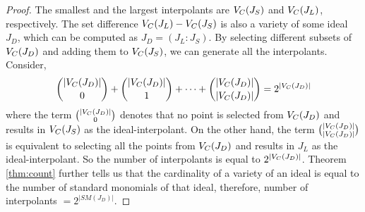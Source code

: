 \par {} 
\begin{proof}
The smallest and the largest interpolants are ${V_C}(J_S)$ and ${V_C}(J_L)$,
respectively. The set difference ${V_C}(J_L) - {V_C}(J_S)$ is also a
variety of some ideal $J_D$, which can be computed as
$J_D=(J_L:J_S)$. By selecting different subsets of ${V_C}(J_D)$ and
adding them to ${V_C}(J_S)$, we can generate all the 
interpolants. Consider, 
\begin{align*}
\label{eqn:pwsetjd}
\binom{|{V_C}(J_D)|}{0} + \binom{|{V_C}(J_D)|}{1} + \cdots + \binom{|{V_C}(J_D)|}{|{V_C}(J_D)|} = 2^{|{V_C}(J_D)|}
\end{align*}
where the term $\binom{|{V_C}(J_D)|}{0}$ denotes that no point is selected from ${V_C}(J_D)$ and results in 
${V_C}(J_S)$ as the ideal-interpolant. On the other hand, the term $\binom{|{V_C}(J_D)|}{|{V_C}(J_D)|}$ is equivalent 
to selecting  all the points from ${V_C}(J_D)$ and results in $J_L$ as 
the ideal-interpolant. So the number of interpolants is equal to
$2^{|{V_C}(J_D)|}$. Theorem \ref{thm:count} further tells us that the 
cardinality of a variety of an ideal is equal to the number of
standard monomials of that ideal, therefore, number of interpolants $=
2^{|SM(J_D)|}$.  

\end{proof}
